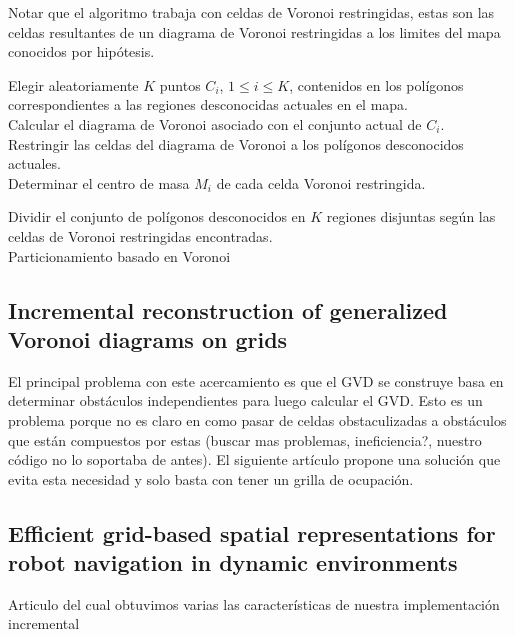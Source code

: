 Notar que el algoritmo trabaja con celdas de Voronoi restringidas, estas son las celdas resultantes de un diagrama de Voronoi restringidas a los limites del mapa conocidos por hipótesis.

\begin{algorithm}
\SetAlgoLined
    Elegir aleatoriamente $K$ puntos $C_i$, $1 \leq i \leq K$, contenidos en los polígonos correspondientes a las regiones desconocidas actuales en el mapa.\\
    Calcular el diagrama de Voronoi asociado con el conjunto actual de $C_i$.\\
    Restringir las celdas del diagrama de Voronoi a los polígonos desconocidos actuales.\\
    Determinar el centro de masa $M_i$ de cada celda Voronoi restringida.\\
    
    Dividir el conjunto de polígonos desconocidos en $K$ regiones disjuntas según las celdas de Voronoi restringidas encontradas.\\
    \caption{Particionamiento basado en Voronoi}
    \label{alg:particionamientovoronoi}
    
\end{algorithm}


\subsection{Incremental reconstruction of generalized Voronoi diagrams on grids}

El principal problema con este acercamiento es que el GVD se construye basa en determinar obstáculos independientes para luego calcular el GVD. Esto es un problema porque no es claro en como pasar de celdas obstaculizadas a obstáculos que están compuestos por estas (buscar mas problemas, ineficiencia?, nuestro código no lo soportaba de antes).  El siguiente artículo propone una solución que evita esta necesidad y solo basta con tener un grilla de ocupación.

\subsection{Efficient grid-based spatial representations for robot navigation in dynamic environments}
Articulo del cual obtuvimos varias las características de nuestra implementación incremental

